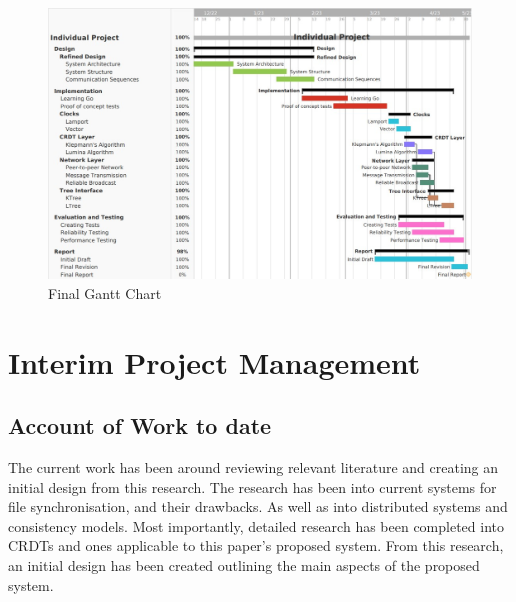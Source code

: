 \documentclass[12pt]{report}
\begin{document}
\begin{figure}[h]
    \centering
    \includegraphics[width=1\textwidth]{images/final_gantt.jpg}
    \caption{Final Gantt Chart}
    \label{fig:gantt_final}
\end{figure}





\printbibliography

\appendix

\chapter{Interim Project Management}

\section{Account of Work to date}
The current work has been around reviewing relevant literature and creating an initial design from this research. The research has been into current systems for file synchronisation, and their drawbacks. As well as into distributed systems and consistency models. Most importantly, detailed research has been completed into CRDTs and ones applicable to this paper's proposed system. From this research, an initial design has been created outlining the main aspects of the proposed system.
\end{document}
